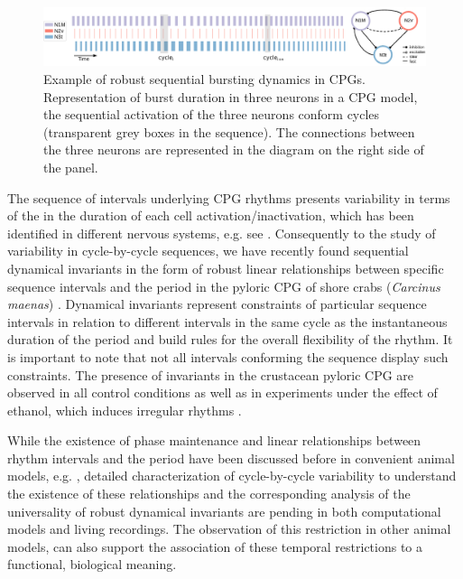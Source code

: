 \begin{figure}[htb!]
	\includegraphics[width=\textwidth]{img/invariants/variability/sequences_in_cpgs.png}
	\caption{Example of robust sequential bursting dynamics in CPGs. Representation of burst duration in three neurons in a CPG model, the sequential activation of the three neurons conform cycles (transparent grey boxes in the sequence). The connections between the three neurons are represented in the diagram on the right side of the panel.}
	\label{fig:sequences_in_cpgs}
\end{figure}

The sequence of intervals underlying CPG rhythms presents variability in terms of the in the duration of each cell activation/inactivation, which has been identified in different nervous systems, e.g. see \cite{reyes_artificial_2008,elliott_temporal_1991,martinez_shortterm_2019}. Consequently to the study of variability in cycle-by-cycle sequences, we have recently found sequential dynamical invariants in the form of robust linear relationships between specific sequence intervals and the period in the pyloric CPG of shore crabs (\textit{Carcinus maenas}) \parencite{elices_robust_2019}. Dynamical invariants represent constraints of particular sequence intervals in relation to different intervals in the same cycle as the instantaneous duration of the period and build rules for the overall flexibility of the rhythm. It is important to note that not all intervals conforming the sequence display such constraints. The presence of invariants in the crustacean pyloric CPG are observed in all control conditions as well as in experiments under the effect of ethanol, which induces irregular rhythms \parencite{elices_robust_2019}. 



While the existence of phase maintenance and linear relationships between rhythm intervals and the period have been discussed before in convenient animal models, e.g. \cite{grillner_generation_1976,hooper_phase_1997,vavoulis_dynamic_2007}, detailed characterization of cycle-by-cycle variability to understand the existence of these relationships and the corresponding analysis of the universality of robust dynamical invariants are pending in both computational models and living recordings. The observation of this restriction in other animal models, can also support the association of these temporal restrictions to a functional, biological meaning.

